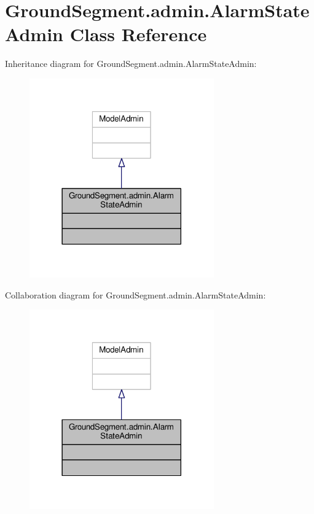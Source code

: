 \hypertarget{class_ground_segment_1_1admin_1_1_alarm_state_admin}{}\section{Ground\+Segment.\+admin.\+Alarm\+State\+Admin Class Reference}
\label{class_ground_segment_1_1admin_1_1_alarm_state_admin}


Inheritance diagram for Ground\+Segment.\+admin.\+Alarm\+State\+Admin\+:\nopagebreak
\begin{figure}[H]
\begin{center}
\leavevmode
\includegraphics[width=225pt]{class_ground_segment_1_1admin_1_1_alarm_state_admin__inherit__graph}
\end{center}
\end{figure}


Collaboration diagram for Ground\+Segment.\+admin.\+Alarm\+State\+Admin\+:\nopagebreak
\begin{figure}[H]
\begin{center}
\leavevmode
\includegraphics[width=225pt]{class_ground_segment_1_1admin_1_1_alarm_state_admin__coll__graph}
\end{center}
\end{figure}


